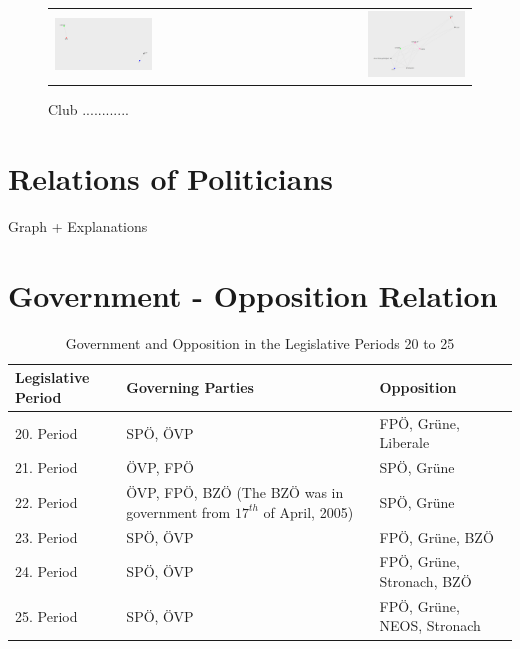 \begin{figure}
\begin{tabular}{ l r}
	\includegraphics[width=0.49\textwidth]{imgs/graphs/club-graphs/clubs_21} & \includegraphics[width=0.49\textwidth]{imgs/graphs/club-graphs/clubs_25}
\end{tabular}
	\caption{Club ............}
	\label{fig:club_graphs1}
\end{figure}


\section{Relations of Politicians}
Graph + Explanations

\section{Government - Opposition Relation}
\label{sec:gov_opp_relation}

\begin{table}[h]

\centering
\bgroup
\def\arraystretch{1.2}
\begin{tabular}{| p{2cm} | p{5cm} | l |}
\hline
  Legislative Period & Governing Parties & Opposition  \\
\hline
\hline
  20. Period & SPÖ, ÖVP & FPÖ, Grüne, Liberale \\
\hline
  21. Period & ÖVP, FPÖ & SPÖ, Grüne \\
\hline
  22. Period & ÖVP, FPÖ, BZÖ (The BZÖ was in government from $17^{th}$ of April, 2005) & SPÖ, Grüne \\
\hline
  23. Period & SPÖ, ÖVP & FPÖ, Grüne, BZÖ \\
\hline
  24. Period & SPÖ, ÖVP & FPÖ, Grüne, Stronach, BZÖ \\
\hline
  25. Period & SPÖ, ÖVP & FPÖ, Grüne, NEOS, Stronach \\
\hline

\end{tabular}
\egroup
\caption{Government and Opposition in the Legislative Periods 20 to 25}
\label{table:gov_opp_parties}
\end{table}



